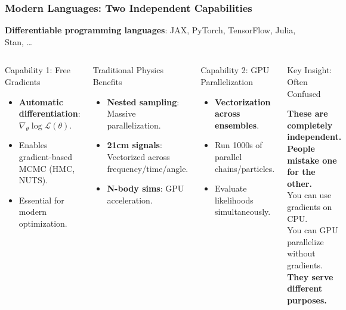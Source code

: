 \documentclass[aspectratio=169]{beamer}
\begin{document}
\begin{frame}
    \frametitle{Modern Languages: Two Independent Capabilities}
    \begin{center}
        \textbf{Differentiable programming languages}: JAX, PyTorch, TensorFlow, Julia, Stan, \ldots
    \end{center}
    \vspace{-5pt}
    \begin{columns}
        \begin{block}{Capability 1: Free Gradients}
            \begin{itemize}
                \item \textbf{Automatic differentiation}: $\nabla_\theta \log \mathcal{L}(\theta)$.
                \item Enables gradient-based MCMC (HMC, NUTS).
                \item Essential for modern optimization.
            \end{itemize}
        \end{block}
        \begin{block}{Traditional Physics Benefits}
            \begin{itemize}
                \item \textbf{Nested sampling}: Massive parallelization.
                \item \textbf{21cm signals}: Vectorized across frequency/time/angle.
                \item \textbf{N-body sims}: GPU acceleration.
            \end{itemize}
        \end{block}
        \begin{block}{Capability 2: GPU Parallelization}
            \begin{itemize}
                \item \textbf{Vectorization across ensembles}.
                \item Run 1000s of parallel chains/particles.
                \item Evaluate likelihoods simultaneously.
            \end{itemize}
        \end{block}
        \begin{block}{Key Insight: Often Confused}
            \begin{center}
                \textbf{These are completely independent.}\\
                \textbf{People mistake one for the other.}\\
                You can use gradients on CPU.\\
                You can GPU parallelize without gradients.\\
                \textbf{They serve different purposes.}
            \end{center}
        \end{block}
    \end{columns}
\end{frame}
\end{document}
